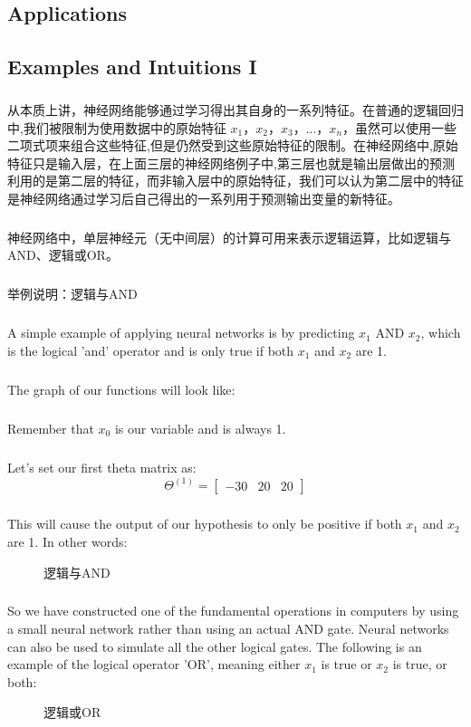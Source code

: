 \documentclass{article}
\begin{document}
\begin{CJK}{UTF8}{gbsn}
\section{Applications}
\subsection{Examples and Intuitions I}
\subparagraph{}
从本质上讲，神经网络能够通过学习得出其自身的一系列特征。在普通的逻辑回归中,我们被限制为使用数据中的原始特征 $x_1$，$x_2$，$x_3$，...，$x_n$，虽然可以使用一些二项式项来组合这些特征,但是仍然受到这些原始特征的限制。在神经网络中,原始特征只是输入层，在上面三层的神经网络例子中,第三层也就是输出层做出的预测利用的是第二层的特征，而非输入层中的原始特征，我们可以认为第二层中的特征是神经网络通过学习后自己得出的一系列用于预测输出变量的新特征。
\subparagraph{}
神经网络中，单层神经元（无中间层）的计算可用来表示逻辑运算，比如逻辑与AND、逻辑或OR。
\subparagraph{}
举例说明：逻辑与AND
\subparagraph{}
A simple example of applying neural networks is by predicting $x_1$ AND $x_2$, which is the logical 'and' operator and is only true if both $x_1$ and $x_2$ are 1.
\subparagraph{}
The graph of our functions will look like:
\begin{figure}[H]
\label{fig:419}
\end{figure}
\subparagraph{}
Remember that $x_0$ is our variable and is always 1.
\subparagraph{}
Let's set our first theta matrix as:
\begin{equation}
\Theta^{(1)}=\left[\begin{matrix}
-30&20&20
\end{matrix}\right]
\end{equation}
\subparagraph{}
This will cause the output of our hypothesis to only be positive if both $x_1$ and $x_2$ are 1. In other words:
\begin{figure}[H]
\label{fig:420}
\end{figure}
\begin{figure}[H]
\caption{逻辑与AND}
\label{fig:421}
\end{figure}
\subparagraph{}
So we have constructed one of the fundamental operations in computers by using a small neural network rather than using an actual AND gate. Neural networks can also be used to simulate all the other logical gates. The following is an example of the logical operator 'OR', meaning either $x_1$ is true or $x_2$ is true, or both:
\begin{figure}[H]
\caption{逻辑或OR}
\label{fig:422}
\end{figure}

\end{CJK}
\end{document}
